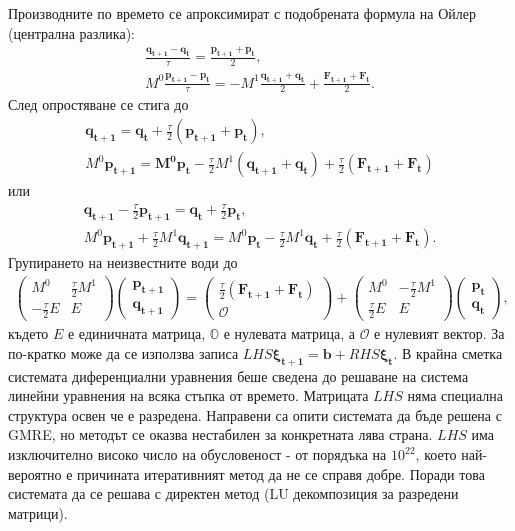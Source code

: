 \documentclass{report}
\begin{document}
	Производните по времето се апроксимират с подобрената формула на Ойлер (централна разлика):
	\begin{align*}
		\frac{\mathbf{q_{t+1}}-\mathbf{q_t}}{\tau}=\frac{\mathbf{p_{t+1}+\mathbf{p_t}}}{2},\\
		M^0\frac{\mathbf{p_{t+1}-\mathbf{p_t}}}{\tau}=-M^1\frac{\mathbf{q_{t+1}+\mathbf{q_t}}}{2}+\frac{\mathbf{F_{t+1}+\mathbf{F_t}}}{2}.
	\end{align*}
	След опростяване се стига до
	\begin{align*}
		\mathbf{q_{t+1}}=\mathbf{q_t} + \frac{\tau}{2}(\mathbf{p_{t+1}+\mathbf{p_t}}),\\
		M^0\mathbf{p_{t+1}=M^0 \mathbf{p_t}}-\frac{\tau}{2}M^1(\mathbf{q_{t+1}+q_t})+\frac{\tau}{2}(\mathbf{F_{t+1}+\mathbf{F_t}})
	\end{align*}
	или
	\begin{align*}
		\mathbf{q_{t+1}} - \frac{\tau}{2}\mathbf{p_{t+1}}=\mathbf{q_t} + \frac{\tau}{2}\mathbf{p_t},\\
		M^0\mathbf{p_{t+1}}+\frac{\tau}{2}M^1\mathbf{q_{t+1}}= M^0 \mathbf{p_t}-\frac{\tau}{2}M^1\mathbf{q_t}+\frac{\tau}{2}(\mathbf{F_{t+1}+\mathbf{F_t}}).
	\end{align*}
	Групирането на неизвестните води до
	\begin{align}
		\begin{pmatrix}
			M^0 & \frac{\tau}{2}M^1
			\\ - \frac{\tau}{2}E & E
		\end{pmatrix}
		\begin{pmatrix}
			\mathbf{p_{t+1}} \\ \mathbf{q_{t+1}}
		\end{pmatrix}
		=
		\begin{pmatrix}
			\frac{\tau}{2}(\mathbf{F_{t+1}+\mathbf{F_t}})\\
			\mathcal{O}
		\end{pmatrix}
		+
		\begin{pmatrix}
			M^0 & -\frac{\tau}{2}M^1\\
			\frac{\tau}{2} E & E
		\end{pmatrix}
		\begin{pmatrix}
			\mathbf{p_t}\\
			\mathbf{q_t}
		\end{pmatrix},
		\label{eq:14}
	\end{align}
	където $E$ е единичната матрица, $\mathbb{O}$ е нулевата матрица, а $\mathcal{O}$ е нулевият вектор. За по-кратко може да се използва записа $\displaystyle LHS \boldsymbol{\xi_{t+1}}=\mathbf{b}+RHS \mathbf{\xi_t}.$ В крайна сметка системата диференциални уравнения беше сведена до решаване на система линейни уравнения на всяка стъпка от времето. Матрицата $LHS$ няма специална структура освен че е разредена. Направени са опити системата да бъде решена с GMRE, но методът се оказва нестабилен за конкретната лява страна. $LHS$ има изключително високо число на обусловеност - от порядъка на $10^{22}$, което най-вероятно е причината итеративният метод да не се справя добре. Поради това системата да се решава с директен метод (LU декомпозиция за разредени матрици).
\end{document}
